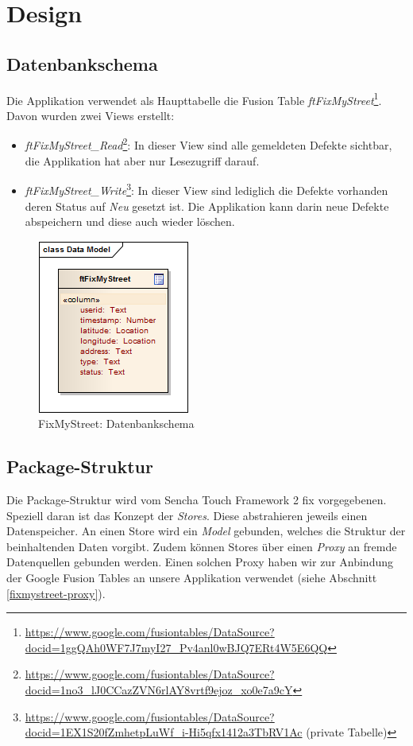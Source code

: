 \section{Design}

\subsection{Datenbankschema}
Die Applikation verwendet als Haupttabelle die Fusion Table \emph{ftFixMyStreet}\footnote{\url{https://www.google.com/fusiontables/DataSource?docid=1ggQAh0WF7J7myI27_Pv4anl0wBJQ7ERt4W5E6QQ}}. Davon wurden zwei Views erstellt:

\begin{itemize}
\item \emph{ftFixMyStreet\_Read}\footnote{\url{https://www.google.com/fusiontables/DataSource?docid=1no3_lJ0CCazZVN6rlAY8vrtf9ejoz_xo0e7a9cY}}: In dieser View sind alle gemeldeten Defekte sichtbar, die Applikation hat aber nur Lesezugriff darauf.
\item \emph{ftFixMyStreet\_Write}\footnote{\url{https://www.google.com/fusiontables/DataSource?docid=1EX1S20fZmhetpLuWf_i-Hi5qfx1412a3TbRV1Ac} (private Tabelle)}: In dieser View sind lediglich die Defekte vorhanden deren Status auf \emph{Neu} gesetzt ist. Die Applikation kann darin neue Defekte abspeichern und diese auch wieder löschen.
\end{itemize}

\begin{figure}[H]
	\centering
	\includegraphics[scale=0.8]{images/usecase2-fixmystreet/uml/fixmystreet-datamodel}
	\caption{FixMyStreet: Datenbankschema}
	\label{fixmystreet-datamodel}
\end{figure}

\subsection{Package-Struktur}
Die Package-Struktur wird vom Sencha Touch Framework 2 fix vorgegebenen. Speziell daran ist das Konzept der \emph{Stores}. Diese abstrahieren jeweils einen Datenspeicher. An einen Store wird ein \emph{Model} gebunden, welches die Struktur der beinhaltenden Daten vorgibt. Zudem können Stores über einen \emph{Proxy} an fremde Datenquellen gebunden werden. Einen solchen Proxy haben wir zur Anbindung der Google Fusion Tables an unsere Applikation verwendet (siehe Abschnitt \ref{fixmystreet-proxy}).

